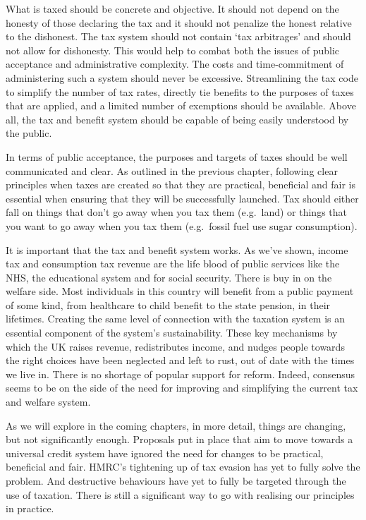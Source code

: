 \documentclass[]{article}
\begin{document}
What is taxed should be concrete and objective. It should not depend on
the honesty of those declaring the tax and it should not penalize the
honest relative to the dishonest. The tax system should not contain `tax
arbitrages' and should not allow for dishonesty. This would help to
combat both the issues of public acceptance and administrative
complexity. The costs and time-commitment of administering such a system
should never be excessive. Streamlining the tax code to simplify the
number of tax rates, directly tie benefits to the purposes of taxes that
are applied, and a limited number of exemptions should be available.
Above all, the tax and benefit system should be capable of being easily
understood by the public.

In terms of public acceptance, the purposes and targets of taxes should
be well communicated and clear. As outlined in the previous chapter,
following clear principles when taxes are created so that they are
practical, beneficial and fair is essential when ensuring that they will
be successfully launched. Tax should either fall on things that don't go
away when you tax them (e.g.~land) or things that you want to go away
when you tax them (e.g.~fossil fuel use sugar consumption).

It is important that the tax and benefit system works. As we've shown,
income tax and consumption tax revenue are the life blood of public
services like the NHS, the educational system and for social security.
There is buy in on the welfare side. Most individuals in this country
will benefit from a public payment of some kind, from healthcare to
child benefit to the state pension, in their lifetimes. Creating the
same level of connection with the taxation system is an essential
component of the system's sustainability. These key mechanisms by which
the UK raises revenue, redistributes income, and nudges people towards
the right choices have been neglected and left to rust, out of date with
the times we live in. There is no shortage of popular support for
reform. Indeed, consensus seems to be on the side of the need for
improving and simplifying the current tax and welfare system.

As we will explore in the coming chapters, in more detail, things are
changing, but not significantly enough. Proposals put in place that aim
to move towards a universal credit system have ignored the need for
changes to be practical, beneficial and fair. HMRC's tightening up of
tax evasion has yet to fully solve the problem. And destructive
behaviours have yet to fully be targeted through the use of taxation.
There is still a significant way to go with realising our principles in
practice.
\end{document}
